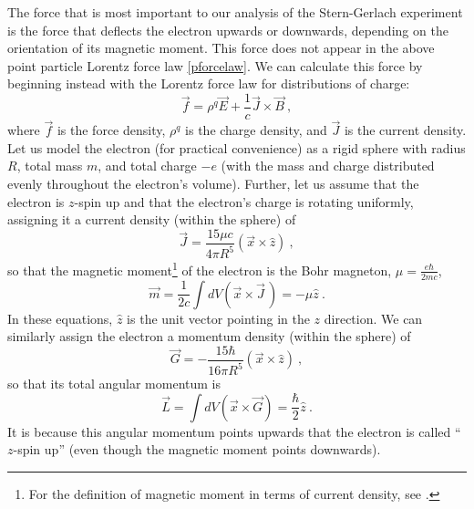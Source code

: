 \documentclass[12pt,secnumarabic,amsmath,amssymb,balancelastpage,nofootinbib]{article}
\begin{document}
The force that is most important to our analysis of the Stern-Gerlach experiment is the force that deflects the electron upwards or downwards, depending on the orientation of its magnetic moment.  This force does not appear in the above point particle Lorentz force law \eqref{pforcelaw}.  We can calculate this force by beginning instead with the Lorentz force law for distributions of charge:
\begin{equation}
\vec{f}= \rho^q  \vec{E} + \frac{1}{c} \vec{J} \times \vec{B}
\ ,
\label{cforcelaw}
\end{equation}
where $\vec{f}$ is the force density, $\rho^q$ is the charge density, and $\vec{J}$ is the current density.  Let us model the electron (for practical convenience) as a rigid sphere with radius $R$, total mass $m$, and total charge $-e$ (with the mass and charge distributed evenly throughout the electron's volume).  Further, let us assume that the electron is $z$-spin up and that the electron's charge is rotating uniformly, assigning it a current density (within the sphere) of
\begin{equation}
\vec{J}=\frac{15 \mu c}{4 \pi R^5} ( \vec{x}\times \hat{z} )
\ ,
\label{zupcurrentsphere}
\end{equation}
so that the magnetic moment\footnote{For the definition of magnetic moment in terms of current density, see \citet[sec.\ 5.6]{jackson}.} of the electron is the Bohr magneton, $\mu=\frac{e \hbar}{2 m c}$,
\begin{equation}
\vec{m}=\frac{1}{2c}\int dV \left(\vec{x} \times \vec{J}\,\right)=-\mu \hat{z}
\ .
\label{zupmagneticmoment}
\end{equation}
In these equations, $\hat{z}$ is the unit vector pointing in the $z$ direction.  We can similarly assign the electron a momentum density (within the sphere) of
\begin{equation}
\vec{G}=-\frac{15 \hbar}{16 \pi R^5} ( \vec{x}\times \hat{z} )
\ ,
\label{zupmomentumsphere}
\end{equation}
so that its total angular momentum is
\begin{equation}
\vec{L}=\int dV \left(\vec{x} \times \vec{G}\right)=\frac{\hbar}{2}\hat{z}
\ .
\label{zupangularmomentum}
\end{equation}
It is because this angular momentum points upwards that the electron is called ``$z$-spin up'' (even though the magnetic moment points downwards).
\end{document}
